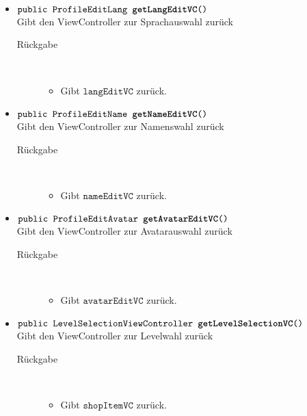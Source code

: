 \begin{description}
\begin{itemize}
		\item $\texttt{public ProfileEditLang \textbf{getLangEditVC}()}$ \\ Gibt den ViewController zur Sprachauswahl zurück
			\begin{description}
			\item[Rückgabe] \hfill \\
			\vspace{-.8cm}
			\begin{itemize}
				\item Gibt $\texttt{langEditVC}$ zurück.
			\end{itemize}
		\end{description}
		
		\item $\texttt{public ProfileEditName \textbf{getNameEditVC}()}$ \\ Gibt den ViewController zur Namenswahl zurück
			\begin{description}
			\item[Rückgabe] \hfill \\
			\vspace{-.8cm}
			\begin{itemize}
				\item Gibt $\texttt{nameEditVC}$ zurück.
			\end{itemize}
		\end{description}
		
		\item $\texttt{public ProfileEditAvatar \textbf{getAvatarEditVC}()}$ \\ Gibt den ViewController zur Avatarauswahl zurück
			\begin{description}
			\item[Rückgabe] \hfill \\
			\vspace{-.8cm}
			\begin{itemize}
				\item Gibt $\texttt{avatarEditVC}$ zurück.
			\end{itemize}
		\end{description}
		
		\item $\texttt{public LevelSelectionViewController \textbf{getLevelSelectionVC}()}$ \\ Gibt den ViewController zur Levelwahl zurück
			\begin{description}
			\item[Rückgabe] \hfill \\
			\vspace{-.8cm}
			\begin{itemize}
				\item Gibt $\texttt{shopItemVC}$ zurück.
			\end{itemize}
		\end{description}
		

\end{itemize}
\end{description}
